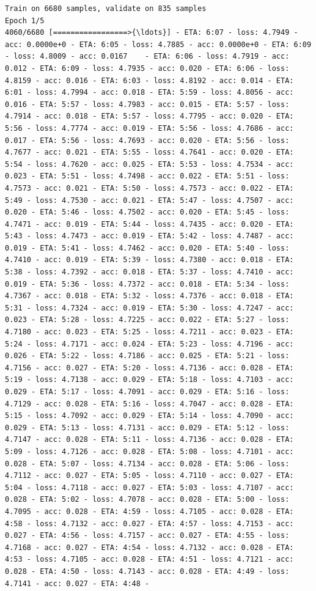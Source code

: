 \documentclass[11pt]{article}
\begin{document}
    \begin{Verbatim}[commandchars=\\\{\}]
Train on 6680 samples, validate on 835 samples
Epoch 1/5
4060/6680 [=================>{\ldots}] - ETA: 6:07 - loss: 4.7949 - acc: 0.0000e+0 - ETA: 6:05 - loss: 4.7885 - acc: 0.0000e+0 - ETA: 6:09 - loss: 4.8009 - acc: 0.0167    - ETA: 6:06 - loss: 4.7919 - acc: 0.012 - ETA: 6:09 - loss: 4.7935 - acc: 0.020 - ETA: 6:06 - loss: 4.8159 - acc: 0.016 - ETA: 6:03 - loss: 4.8192 - acc: 0.014 - ETA: 6:01 - loss: 4.7994 - acc: 0.018 - ETA: 5:59 - loss: 4.8056 - acc: 0.016 - ETA: 5:57 - loss: 4.7983 - acc: 0.015 - ETA: 5:57 - loss: 4.7914 - acc: 0.018 - ETA: 5:57 - loss: 4.7795 - acc: 0.020 - ETA: 5:56 - loss: 4.7774 - acc: 0.019 - ETA: 5:56 - loss: 4.7686 - acc: 0.017 - ETA: 5:56 - loss: 4.7693 - acc: 0.020 - ETA: 5:56 - loss: 4.7677 - acc: 0.021 - ETA: 5:55 - loss: 4.7641 - acc: 0.020 - ETA: 5:54 - loss: 4.7620 - acc: 0.025 - ETA: 5:53 - loss: 4.7534 - acc: 0.023 - ETA: 5:51 - loss: 4.7498 - acc: 0.022 - ETA: 5:51 - loss: 4.7573 - acc: 0.021 - ETA: 5:50 - loss: 4.7573 - acc: 0.022 - ETA: 5:49 - loss: 4.7530 - acc: 0.021 - ETA: 5:47 - loss: 4.7507 - acc: 0.020 - ETA: 5:46 - loss: 4.7502 - acc: 0.020 - ETA: 5:45 - loss: 4.7471 - acc: 0.019 - ETA: 5:44 - loss: 4.7435 - acc: 0.020 - ETA: 5:43 - loss: 4.7473 - acc: 0.019 - ETA: 5:42 - loss: 4.7487 - acc: 0.019 - ETA: 5:41 - loss: 4.7462 - acc: 0.020 - ETA: 5:40 - loss: 4.7410 - acc: 0.019 - ETA: 5:39 - loss: 4.7380 - acc: 0.018 - ETA: 5:38 - loss: 4.7392 - acc: 0.018 - ETA: 5:37 - loss: 4.7410 - acc: 0.019 - ETA: 5:36 - loss: 4.7372 - acc: 0.018 - ETA: 5:34 - loss: 4.7367 - acc: 0.018 - ETA: 5:32 - loss: 4.7376 - acc: 0.018 - ETA: 5:31 - loss: 4.7324 - acc: 0.019 - ETA: 5:30 - loss: 4.7247 - acc: 0.023 - ETA: 5:28 - loss: 4.7225 - acc: 0.022 - ETA: 5:27 - loss: 4.7180 - acc: 0.023 - ETA: 5:25 - loss: 4.7211 - acc: 0.023 - ETA: 5:24 - loss: 4.7171 - acc: 0.024 - ETA: 5:23 - loss: 4.7196 - acc: 0.026 - ETA: 5:22 - loss: 4.7186 - acc: 0.025 - ETA: 5:21 - loss: 4.7156 - acc: 0.027 - ETA: 5:20 - loss: 4.7136 - acc: 0.028 - ETA: 5:19 - loss: 4.7138 - acc: 0.029 - ETA: 5:18 - loss: 4.7103 - acc: 0.029 - ETA: 5:17 - loss: 4.7091 - acc: 0.029 - ETA: 5:16 - loss: 4.7129 - acc: 0.028 - ETA: 5:16 - loss: 4.7047 - acc: 0.028 - ETA: 5:15 - loss: 4.7092 - acc: 0.029 - ETA: 5:14 - loss: 4.7090 - acc: 0.029 - ETA: 5:13 - loss: 4.7131 - acc: 0.029 - ETA: 5:12 - loss: 4.7147 - acc: 0.028 - ETA: 5:11 - loss: 4.7136 - acc: 0.028 - ETA: 5:09 - loss: 4.7126 - acc: 0.028 - ETA: 5:08 - loss: 4.7101 - acc: 0.028 - ETA: 5:07 - loss: 4.7134 - acc: 0.028 - ETA: 5:06 - loss: 4.7112 - acc: 0.027 - ETA: 5:05 - loss: 4.7110 - acc: 0.027 - ETA: 5:04 - loss: 4.7118 - acc: 0.027 - ETA: 5:03 - loss: 4.7107 - acc: 0.028 - ETA: 5:02 - loss: 4.7078 - acc: 0.028 - ETA: 5:00 - loss: 4.7095 - acc: 0.028 - ETA: 4:59 - loss: 4.7105 - acc: 0.028 - ETA: 4:58 - loss: 4.7132 - acc: 0.027 - ETA: 4:57 - loss: 4.7153 - acc: 0.027 - ETA: 4:56 - loss: 4.7157 - acc: 0.027 - ETA: 4:55 - loss: 4.7168 - acc: 0.027 - ETA: 4:54 - loss: 4.7132 - acc: 0.028 - ETA: 4:53 - loss: 4.7105 - acc: 0.028 - ETA: 4:51 - loss: 4.7121 - acc: 0.028 - ETA: 4:50 - loss: 4.7143 - acc: 0.028 - ETA: 4:49 - loss: 4.7141 - acc: 0.027 - ETA: 4:48 - 
\end{Verbatim}
\end{document}
